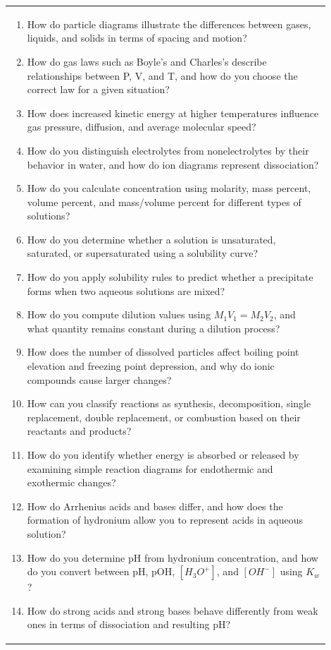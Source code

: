 \documentclass{article}
\begin{document}
\newpage
\begin{tabular}{|p{0.9\linewidth}|}
\hline
\begin{enumerate}
\item How do particle diagrams illustrate the differences between gases, liquids, and solids in terms of spacing and motion?
\item How do gas laws such as Boyle’s and Charles’s describe relationships between P, V, and T, and how do you choose the correct law for a given situation?
\item How does increased kinetic energy at higher temperatures influence gas pressure, diffusion, and average molecular speed?
\item How do you distinguish electrolytes from nonelectrolytes by their behavior in water, and how do ion diagrams represent dissociation?
\item How do you calculate concentration using molarity, mass percent, volume percent, and mass/volume percent for different types of solutions?
\item How do you determine whether a solution is unsaturated, saturated, or supersaturated using a solubility curve?
\item How do you apply solubility rules to predict whether a precipitate forms when two aqueous solutions are mixed?
\item How do you compute dilution values using $M_{1}V_{1} = M_{2}V_{2}$, and what quantity remains constant during a dilution process?
\item How does the number of dissolved particles affect boiling point elevation and freezing point depression, and why do ionic compounds cause larger changes?
\item How can you classify reactions as synthesis, decomposition, single replacement, double replacement, or combustion based on their reactants and products?
\item How do you identify whether energy is absorbed or released by examining simple reaction diagrams for endothermic and exothermic changes?
\item How do Arrhenius acids and bases differ, and how does the formation of hydronium allow you to represent acids in aqueous solution?
\item How do you determine pH from hydronium concentration, and how do you convert between pH, pOH, $[H_{3}O^{+}]$, and $[OH^{-}]$ using $K_w$?
\item How do strong acids and strong bases behave differently from weak ones in terms of dissociation and resulting pH?

\end{enumerate}
\end{tabular}
\end{document}
